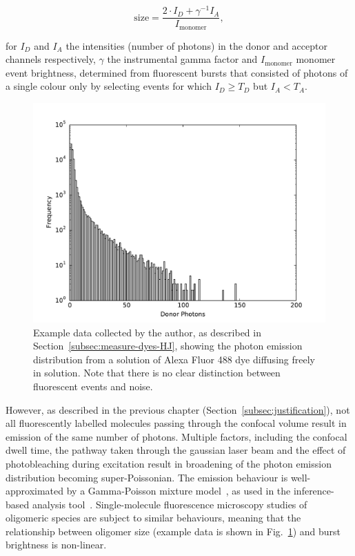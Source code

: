 \begin{equation}
\text{size} = \frac{2\cdot I_D + \gamma^{-1} I_A}{I_{\text{monomer}}},
\label{eq:size_linear}
\end{equation}

for $I_D$ and $I_A$ the intensities (number of photons) in the donor and acceptor channels respectively, $\gamma$ the instrumental gamma factor and $I_{\text{monomer}}$ monomer event brightness, determined from fluorescent bursts that consisted of photons of a single colour only by selecting events for which $I_D \geq T_D$ but $I_A < T_A$.

\begin{figure}
   \begin{center}
      \includegraphics*[clip=true, width=5in]{sizing/data_blue_dye_sample.pdf}
      \caption{Example data collected by the author, as described in Section~\ref{subsec:measure-dyes-HJ}, showing the photon emission distribution from a solution of Alexa Fluor 488 dye diffusing freely in solution. Note that there is no clear distinction between fluorescent events and noise.}
      \label{fig:example_monomer_emission}
   \end{center}
\end{figure}


However, as described in the previous chapter (Section~\ref{subsec:justification}), not all fluorescently labelled molecules passing through the confocal volume result in emission of the same number of photons. Multiple factors, including the confocal dwell time, the pathway taken through the gaussian laser beam and the effect of photobleaching during excitation result in broadening of the photon emission distribution becoming super-Poissonian. The emission behaviour is well-approximated by a Gamma-Poisson mixture model~\cite{chen1999}, as used in the inference-based analysis tool~\cite{murphy14}. Single-molecule fluorescence microscopy studies of oligomeric species are subject to similar behaviours, meaning that the relationship between oligomer size (example data is shown in Fig.~\ref{fig:example_monomer_emission}) and burst brightness is non-linear. 

